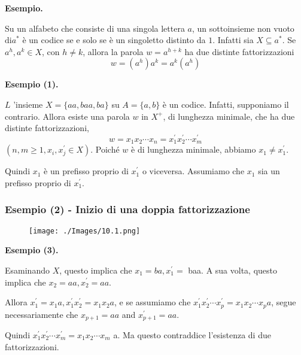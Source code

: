 \vspace{5mm}

\textbf{Esempio.}

Su un alfabeto che consiste di una singola lettera $a$, un sottoinsieme non vuoto $\mathrm{di} a^{*}$ è un codice se e solo se è un singoletto distinto da $1 .$
Infatti sia $X \subseteq a^{*} .$ Se $a^{h}, a^{k} \in X$, con $h \neq k$, allora la parola $w=a^{h+k}$ ha due distinte fattorizzazioni
$$
w=\left(a^{h}\right) a^{k}=a^{k}\left(a^{h}\right)
$$

\vspace{5mm}

\textbf{Esempio (1).}

$L$ 'insieme $X=\{a a, b a a, b a\}$ su $A=\{a, b\}$ è un codice.
Infatti, supponiamo il contrario. Allora esiste una parola $w$ in $X^{+}$, di lunghezza minimale, che ha due distinte fattorizzazioni,
$$
w=x_{1} x_{2} \cdots x_{n}=x_{1}^{\prime} x_{2}^{\prime} \cdots x_{m}^{\prime}
$$
$\left(n, m \geq 1, x_{i}, x_{j}^{\prime} \in X\right)$. Poiché $w$ è di lunghezza minimale, abbiamo $x_{1} \neq x_{1}^{\prime} .$

Quindi $x_{1}$ è un prefisso proprio di $x_{1}^{\prime}$ o viceversa. Assumiamo che $x_{1}$ sia un prefisso proprio di $x_{1}^{\prime}$.

\subsubsection{Esempio (2) - Inizio di una doppia fattorizzazione}

\begin{figure}[hbpt!]
    \centering
    \texttt{[image: ./Images/10.1.png]}
\end{figure}
\FloatBarrier

\textbf{Esempio (3).}

Esaminando $X$, questo implica che $x_{1}=b a, x_{1}^{\prime}=$ baa.
A sua volta, questo implica che $x_{2}=a a, x_{2}^{\prime}=a a$.

Allora $x_{1}^{\prime}=x_{1} a, x_{1}^{\prime} x_{2}^{\prime}=x_{1} x_{2} a$, e se assumiamo che $x_{1}^{\prime} x_{2}^{\prime} \cdots x_{p}^{\prime}=x_{1} x_{2} \cdots x_{p} a$, segue necessariamente che $x_{p+1}=a a$ and $x_{p+1}^{\prime}=a a$.

Quindi $x_{1}^{\prime} x_{2}^{\prime} \cdots x_{m}^{\prime}=x_{1} x_{2} \cdots x_{m}$ a. Ma questo contraddice l'esistenza di due fattorizzazioni.

\vspace{5mm}

